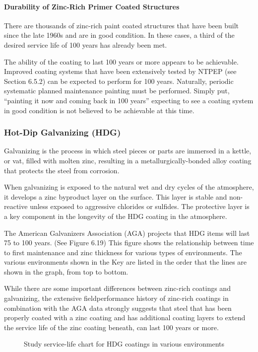 \paragraph{Durability of Zinc-Rich Primer Coated Structures}
There are thousands of zinc-rich paint coated structures that have been built since the late 1960s and are in good
condition. In these cases, a third of the desired service life of 100 years has already been met.

The ability of the coating to last 100 years or more appears to be achievable. Improved coating systems that have
been extensively tested by NTPEP (see Section 6.5.2) can be expected to perform for 100 years. Naturally, periodic
systematic planned maintenance painting must be performed. Simply put, “painting it now and coming back in 100
years” expecting to see a coating system in good condition is not believed to be achievable at this time.

\subsubsection{Hot-Dip Galvanizing (HDG)}
Galvanizing is the process in which steel pieces or parts are immersed in a kettle, or vat, filled with molten zinc,
resulting in a metallurgically-bonded alloy coating that protects the steel from corrosion.

When galvanizing is exposed to the natural wet and dry cycles of the atmosphere, it develops a zinc byproduct
layer on the surface. This layer is stable and non-reactive unless exposed to aggressive chlorides or sulfides. The
protective layer is a key component in the longevity of the HDG coating in the atmosphere.

The American Galvanizers Association (AGA) projects that HDG items will last 75 to 100 years. (See Figure
6.19) This figure shows the relationship between time to first maintenance and zinc thickness for various types of
environments. The various environments shown in the Key are listed in the order that the lines are shown in the
graph, from top to bottom.

While there are some important differences between zinc-rich coatings and galvanizing, the extensive fieldperformance
history of zinc-rich coatings in combination with the AGA data strongly suggests that steel that has been
properly coated with a zinc coating and has additional coating layers to extend the service life of the zinc coating
beneath, can last 100 years or more.

\begin{figure}
  \caption{Study service-life chart for HDG coatings in various environments}
  \label{fig:hdg-various-environments}
\end{figure}

